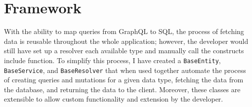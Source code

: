 \section{Framework}
With the ability to map queries from GraphQL to SQL, the process of fetching data is reusable throughout the whole application; however, the developer would still have set up a resolver each available type and manually call the constructs include function.  To simplify this process, I have created a \verb!BaseEntity!, \verb!BaseService!, and \verb!BaseResolver! that when used together automate the process of creating queries and mutations for a given data type, fetching the data from the database, and returning the data to the client.  Moreover, these classes are extensible to allow custom functionality and extension by the developer.







